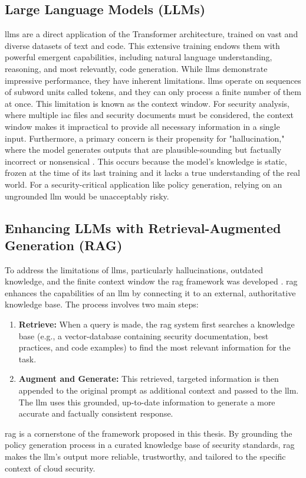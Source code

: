\subsection{Large Language Models (LLMs)}
\glspl{llm} are a direct application of the Transformer architecture, trained on vast and diverse datasets of text and code. This extensive training endows them with powerful emergent capabilities, including natural language understanding, reasoning, and most relevantly, code generation. While \glspl{llm} demonstrate impressive performance, they have inherent limitations. \glspl{llm} operate on sequences of subword units called tokens, and they can only process a finite number of them at once. This limitation is known as the context window. For security analysis, where multiple \gls{iac} files and security documents must be considered, the context window makes it impractical to provide all necessary information in a single input. Furthermore, a primary concern is their propensity for "hallucination," where the model generates outputs that are plausible-sounding but factually incorrect or nonsensical \cite{haque_sok_2025-1}. This occurs because the model's knowledge is static, frozen at the time of its last training and it lacks a true understanding of the real world. For a security-critical application like policy generation, relying on an ungrounded \gls{llm} would be unacceptably risky.

\subsection{Enhancing LLMs with Retrieval-Augmented Generation (RAG)}
To address the limitations of \glspl{llm}, particularly hallucinations, outdated knowledge, and the finite context window the \gls{rag} framework was developed \cite{lewis_retrieval-augmented_2020}. \gls{rag} enhances the capabilities of an \gls{llm} by connecting it to an external, authoritative knowledge base. The process involves two main steps:
\begin{enumerate}
    \item \textbf{Retrieve:} When a query is made, the \gls{rag} system first searches a knowledge base (e.g., a \gls{vector-database} containing security documentation, best practices, and code examples) to find the most relevant information for the task.
    \item \textbf{Augment and Generate:} This retrieved, targeted information is then appended to the original prompt as additional context and passed to the \gls{llm}. The \gls{llm} uses this grounded, up-to-date information to generate a more accurate and factually consistent response.
\end{enumerate}
\gls{rag} is a cornerstone of the framework proposed in this thesis. By grounding the policy generation process in a curated knowledge base of security standards, \gls{rag} makes the \gls{llm}'s output more reliable, trustworthy, and tailored to the specific context of cloud security.

